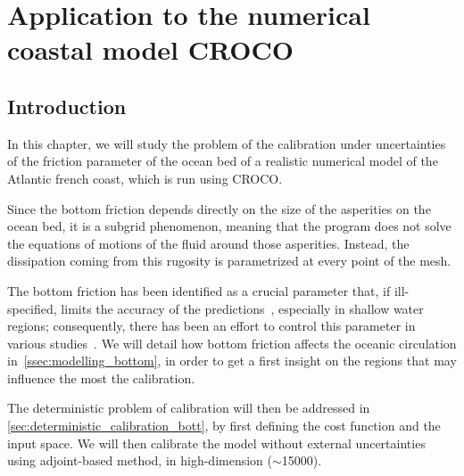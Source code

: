 \documentclass[../../Main_ManuscritThese.tex]{subfiles}
\newcommand{\CROCO}{CROCO}
\begin{document}
\chapter{Application to the numerical coastal model \CROCO}
\label{chap:croco}
\minitoc
\newpage
\subfileLocal{\pagestyle{contentStyle}}

\section{Introduction}
\label{sec:intro_croco}


In this chapter, we will study the problem of the calibration under
uncertainties of the friction parameter of the ocean bed of a realistic
numerical model of the Atlantic french coast, which is run using \CROCO. 

Since the bottom friction depends directly on the size of the
asperities on the ocean bed, it is a subgrid phenomenon, meaning that
the program does not solve the equations of motions of the fluid
around those asperities. Instead, the dissipation coming from this
rugosity is parametrized at every point of the mesh.

The bottom friction has been identified as a crucial parameter that,
if ill-specified, limits the accuracy of the
predictions~\cite{sinha_principal_1997,kreitmair_effect_2019},
especially in shallow water regions; consequently, there has been an
effort to control this parameter in various
studies~\cite{das_variational_1992,das_estimation_1991,boutet_estimation_2015}.
We will detail how bottom friction affects the oceanic circulation
in~\cref{ssec:modelling_bottom}, in order to get a first insight on
the regions that may influence the most the calibration.

The deterministic problem of calibration will then be addressed in
\cref{sec:deterministic_calibration_bott}, by first defining the cost
function and the input space. We will then calibrate the model without
external uncertainties using adjoint-based method, in high-dimension
($\sim$\num{15000}).
\end{document}
